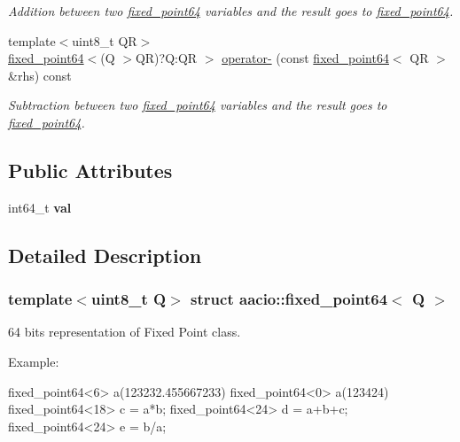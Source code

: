 \begin{DoxyCompactItemize}
\begin{DoxyCompactList}\small\item\em Addition between two \mbox{\hyperlink{structaacio_1_1fixed__point64}{fixed\+\_\+point64}} variables and the result goes to \mbox{\hyperlink{structaacio_1_1fixed__point64}{fixed\+\_\+point64}}. \end{DoxyCompactList}\item 
{\footnotesize template$<$uint8\+\_\+t QR$>$ }\\\mbox{\hyperlink{structaacio_1_1fixed__point64}{fixed\+\_\+point64}}$<$(Q $>$QR)?Q\+:\+QR $>$ \mbox{\hyperlink{group__fixedpoint_ga4adb183ccf49ea8a378585c373b9902a}{operator-\/}} (const \mbox{\hyperlink{structaacio_1_1fixed__point64}{fixed\+\_\+point64}}$<$ QR $>$ \&rhs) const
\begin{DoxyCompactList}\small\item\em Subtraction between two \mbox{\hyperlink{structaacio_1_1fixed__point64}{fixed\+\_\+point64}} variables and the result goes to \mbox{\hyperlink{structaacio_1_1fixed__point64}{fixed\+\_\+point64}}. \end{DoxyCompactList}\end{DoxyCompactItemize}
\subsection*{Public Attributes}
\begin{DoxyCompactItemize}
\item 
\mbox{\label{structaacio_1_1fixed__point64_aff0c692bff11565c2a55018f0ac764b9}} 
int64\+\_\+t {\bfseries val}
\end{DoxyCompactItemize}


\subsection{Detailed Description}
\subsubsection*{template$<$uint8\+\_\+t Q$>$\newline
struct aacio\+::fixed\+\_\+point64$<$ Q $>$}

64 bits representation of Fixed Point class. 

Example\+: 
\begin{DoxyCode}
fixed\_point64<6> a(123232.455667233)
fixed\_point64<0> a(123424)
fixed\_point64<18> c = a*b;
fixed\_point64<24> d = a+b+c;
fixed\_point64<24> e = b/a;
\end{DoxyCode}
 

